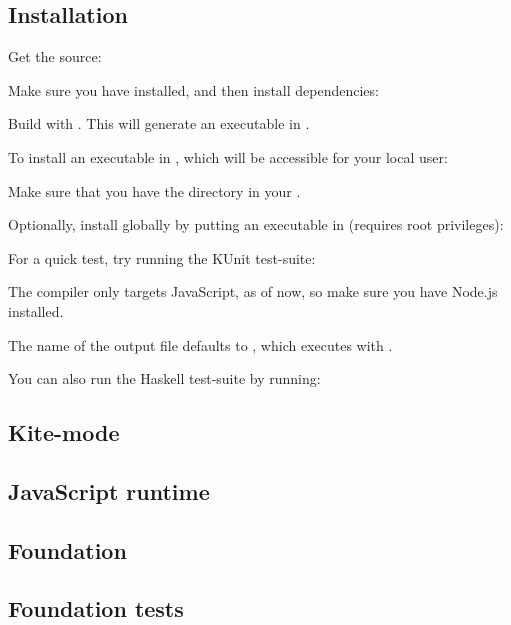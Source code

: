 
\subsection{Installation}
\label{installation}
Get the source:


Make sure you have  installed, and then install dependencies:


Build with . This will generate an executable in .


To install an executable in , which will be accessible for your local user:


Make sure that you have the  directory in your .

Optionally, install globally by putting an executable in  (requires root privileges):


For a quick test, try running the KUnit test-suite:


The compiler only targets JavaScript, as of now, so make sure you have Node.js installed.

The name of the output file defaults to , which executes with .


You can also run the Haskell test-suite by running:


\subsection{Kite-mode}
\label{kite-mode}


\subsection{JavaScript runtime}
\label{kt-runtime}


\subsection{Foundation}
\label{foundation}


\subsection{Foundation tests}
\label{sec:foundation-tests}

